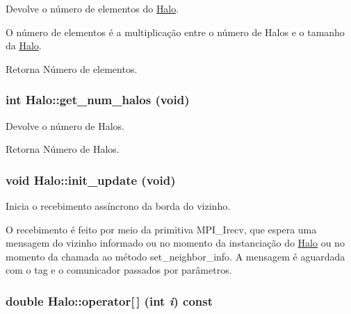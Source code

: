 Devolve o número de elementos do \hyperlink{classHalo}{Halo}. 

O número de elementos é a multiplicação entre o número de Halos e o tamanho da \hyperlink{classHalo}{Halo}.

\begin{DoxyReturn}{Retorna}
Número de elementos. 
\end{DoxyReturn}
\hypertarget{classHalo_ae432b6c70a8146d6e03863928e3c9bd8}{
\subsubsection[{get\_\-num\_\-halos}]{\setlength{\rightskip}{0pt plus 5cm}int Halo::get\_\-num\_\-halos (void)}}
\label{classHalo_ae432b6c70a8146d6e03863928e3c9bd8}


Devolve o número de Halos. 

\begin{DoxyReturn}{Retorna}
Número de Halos. 
\end{DoxyReturn}
\hypertarget{classHalo_af6ec299cf31527dea4a92f994ed2c458}{
\subsubsection[{init\_\-update}]{\setlength{\rightskip}{0pt plus 5cm}void Halo::init\_\-update (void)}}
\label{classHalo_af6ec299cf31527dea4a92f994ed2c458}


Inicia o recebimento assíncrono da borda do vizinho. 

O recebimento é feito por meio da primitiva MPI\_\-Irecv, que espera uma mensagem do vizinho informado ou no momento da instanciação do \hyperlink{classHalo}{Halo} ou no momento da chamada ao método set\_\-neighbor\_\-info. A mensagem é aguardada com o tag e o comunicador passados por parâmetros. \hypertarget{classHalo_ab448a5a0de13574527ca06653d05e049}{
\subsubsection[{operator[]}]{\setlength{\rightskip}{0pt plus 5cm}double Halo::operator\mbox{[}$\,$\mbox{]} (int {\em i}) const}}
\label{classHalo_ab448a5a0de13574527ca06653d05e049}


